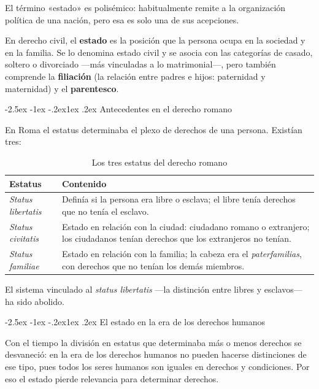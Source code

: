 \documentclass[12pt,oneside]{book}
\makeatletter
\renewcommand\subsection{\@startsection{subsection}{2}{\z@}%
  {-2.5ex \@plus -1ex \@minus -.2ex}{1ex \@plus .2ex}%
  {\normalfont\normalsize\bfseries}}
\makeatother
\begin{document}
El término «estado» es polisémico: habitualmente remite a la organización política de una nación, pero esa es solo una de sus acepciones.

\begin{definicion}
En derecho civil, el \textbf{estado} es la posición que la persona ocupa en la sociedad y en la familia. Se lo denomina estado civil y se asocia con las categorías de casado, soltero o divorciado ---más vinculadas a lo matrimonial---, pero también comprende la \textbf{filiación} (la relación entre padres e hijos: paternidad y maternidad) y el \textbf{parentesco}.
\end{definicion}

\subsection{Antecedentes en el derecho romano}

En Roma el estatus determinaba el plexo de derechos de una persona. Existían tres:

\begin{table}[H]
\centering
\begin{tabularx}{\textwidth}{B{0.22\textwidth} Y}
\toprule
\textbf{Estatus} & \textbf{Contenido} \\
\midrule
\textit{Status libertatis} & Definía si la persona era libre o esclava; el libre tenía derechos que no tenía el esclavo. \\
\textit{Status civitatis} & Estado en relación con la ciudad: ciudadano romano o extranjero; los ciudadanos tenían derechos que los extranjeros no tenían. \\
\textit{Status familiae} & Estado en relación con la familia; la cabeza era el \textit{paterfamilias}, con derechos que no tenían los demás miembros. \\
\bottomrule
\end{tabularx}
\caption{Los tres estatus del derecho romano}
\end{table}

El sistema vinculado al \textit{status libertatis} ---la distinción entre libres y esclavos--- ha sido abolido.

\subsection{El estado en la era de los derechos humanos}

Con el tiempo la división en estatus que determinaba más o menos derechos se desvaneció: en la era de los derechos humanos no pueden hacerse distinciones de ese tipo, pues todos los seres humanos son iguales en derechos y condiciones. Por eso el estado pierde relevancia para determinar derechos.
\end{document}
